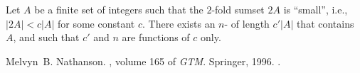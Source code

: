 \documentclass[12pt]{article}
\begin{document}
Let $A$ be a finite set of integers such that the $2$-fold sumset $2A$ is ``small'', i.e., $|2A|<c|A|$ for some constant $c$. There exists an $n$- of length $c'|A|$ that contains $A$, and such that $c'$ and $n$ are functions of $c$ only.

\begin{thebibliography}{1}

Melvyn~B. Nathanson.
, volume 165 of {\em GTM}.
\newblock Springer, 1996.
\newblock {}.

\end{thebibliography}
\end{document}
